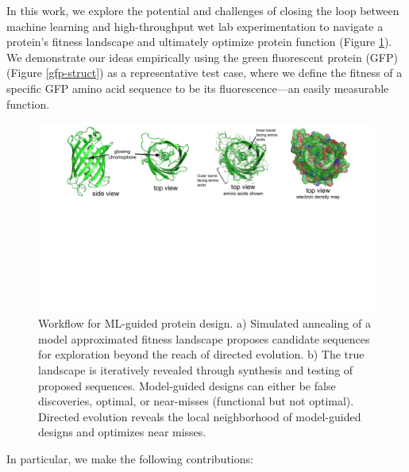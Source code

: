In this work, we explore the potential and challenges of closing the loop between machine learning and high-throughput wet lab experimentation to navigate a protein’s fitness landscape and ultimately optimize protein function (Figure \ref{workflow}). We demonstrate our ideas empirically using the green fluorescent protein (GFP) (Figure \ref{gfp-struct}) as a representative test case, where we define the fitness of a specific GFP amino acid sequence to be its fluorescence---an easily measurable function.

\begin{figure}[t!]
  \includegraphics[width=1\linewidth,page=2,trim={2cm 7cm 2cm 0}]{figures/2018-05-09-NIPS_2018_Figures.pdf}
  \caption[Workflow for ML-guided protein design.]{\small{
    Workflow for ML-guided protein design. a) Simulated annealing of a model approximated fitness landscape proposes candidate sequences for exploration beyond the reach of directed evolution. b) The true landscape is iteratively revealed through synthesis and testing of proposed sequences. Model-guided designs can either be false discoveries, optimal, or near-misses (functional but not optimal). Directed evolution reveals the local neighborhood of model-guided designs and optimizes near misses.}
  }
  \label{workflow}
\end{figure}

In particular, we make the following contributions:

